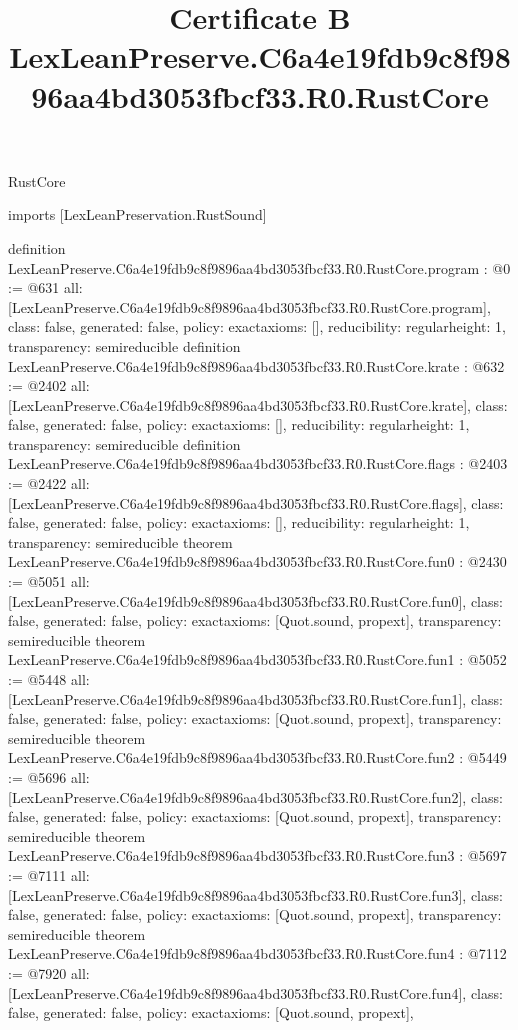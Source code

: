 \begin{lexlean}{RustCore}
\title{Certificate B LexLeanPreserve.C6a4e19fdb9c8f9896aa4bd3053fbcf33.R0.RustCore}
\begin{coremodule}
imports [LexLeanPreservation.RustSound]

definition LexLeanPreserve.C6a4e19fdb9c8f9896aa4bd3053fbcf33.R0.RustCore.program : @0 := @631 {
  all: [LexLeanPreserve.C6a4e19fdb9c8f9896aa4bd3053fbcf33.R0.RustCore.program],
  class: false,
  generated: false,
  policy: exact{axioms: []},
  reducibility: regular{height: 1},
  transparency: semireducible
}
definition LexLeanPreserve.C6a4e19fdb9c8f9896aa4bd3053fbcf33.R0.RustCore.krate : @632 := @2402 {
  all: [LexLeanPreserve.C6a4e19fdb9c8f9896aa4bd3053fbcf33.R0.RustCore.krate],
  class: false,
  generated: false,
  policy: exact{axioms: []},
  reducibility: regular{height: 1},
  transparency: semireducible
}
definition LexLeanPreserve.C6a4e19fdb9c8f9896aa4bd3053fbcf33.R0.RustCore.flags : @2403 := @2422 {
  all: [LexLeanPreserve.C6a4e19fdb9c8f9896aa4bd3053fbcf33.R0.RustCore.flags],
  class: false,
  generated: false,
  policy: exact{axioms: []},
  reducibility: regular{height: 1},
  transparency: semireducible
}
theorem LexLeanPreserve.C6a4e19fdb9c8f9896aa4bd3053fbcf33.R0.RustCore.fun0 : @2430 := @5051 {
  all: [LexLeanPreserve.C6a4e19fdb9c8f9896aa4bd3053fbcf33.R0.RustCore.fun0],
  class: false,
  generated: false,
  policy: exact{axioms: [Quot.sound, propext]},
  transparency: semireducible
}
theorem LexLeanPreserve.C6a4e19fdb9c8f9896aa4bd3053fbcf33.R0.RustCore.fun1 : @5052 := @5448 {
  all: [LexLeanPreserve.C6a4e19fdb9c8f9896aa4bd3053fbcf33.R0.RustCore.fun1],
  class: false,
  generated: false,
  policy: exact{axioms: [Quot.sound, propext]},
  transparency: semireducible
}
theorem LexLeanPreserve.C6a4e19fdb9c8f9896aa4bd3053fbcf33.R0.RustCore.fun2 : @5449 := @5696 {
  all: [LexLeanPreserve.C6a4e19fdb9c8f9896aa4bd3053fbcf33.R0.RustCore.fun2],
  class: false,
  generated: false,
  policy: exact{axioms: [Quot.sound, propext]},
  transparency: semireducible
}
theorem LexLeanPreserve.C6a4e19fdb9c8f9896aa4bd3053fbcf33.R0.RustCore.fun3 : @5697 := @7111 {
  all: [LexLeanPreserve.C6a4e19fdb9c8f9896aa4bd3053fbcf33.R0.RustCore.fun3],
  class: false,
  generated: false,
  policy: exact{axioms: [Quot.sound, propext]},
  transparency: semireducible
}
theorem LexLeanPreserve.C6a4e19fdb9c8f9896aa4bd3053fbcf33.R0.RustCore.fun4 : @7112 := @7920 {
  all: [LexLeanPreserve.C6a4e19fdb9c8f9896aa4bd3053fbcf33.R0.RustCore.fun4],
  class: false,
  generated: false,
  policy: exact{axioms: [Quot.sound, propext]},
}
\end{coremodule}
\end{lexlean}
